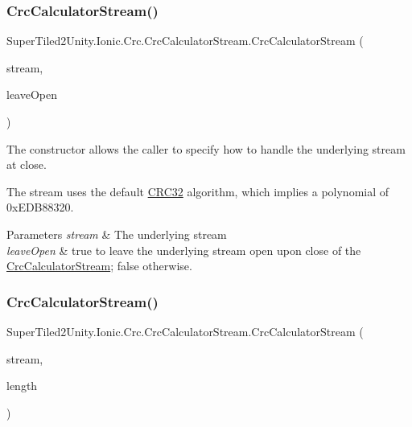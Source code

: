 \subsubsection{\texorpdfstring{Crc\+Calculator\+Stream()}{CrcCalculatorStream()}\hspace{0.1cm}{\footnotesize\ttfamily [2/5]}}
{\footnotesize\ttfamily Super\+Tiled2\+Unity.\+Ionic.\+Crc.\+Crc\+Calculator\+Stream.\+Crc\+Calculator\+Stream (\begin{DoxyParamCaption}\item[{System.\+I\+O.\+Stream}]{stream,  }\item[{bool}]{leave\+Open }\end{DoxyParamCaption})}



The constructor allows the caller to specify how to handle the underlying stream at close. 

The stream uses the default \mbox{\hyperlink{class_super_tiled2_unity_1_1_ionic_1_1_crc_1_1_c_r_c32}{C\+R\+C32}} algorithm, which implies a polynomial of 0x\+E\+D\+B88320. 


\begin{DoxyParams}{Parameters}
{\em stream} & The underlying stream\\
\hline
{\em leave\+Open} & true to leave the underlying stream open upon close of the {\ttfamily \mbox{\hyperlink{class_super_tiled2_unity_1_1_ionic_1_1_crc_1_1_crc_calculator_stream}{Crc\+Calculator\+Stream}}}; false otherwise.\\
\hline
\end{DoxyParams}
\mbox{\label{class_super_tiled2_unity_1_1_ionic_1_1_crc_1_1_crc_calculator_stream_a51e8a4bd2e462dd66b58881a9aae18fc}} 
\subsubsection{\texorpdfstring{Crc\+Calculator\+Stream()}{CrcCalculatorStream()}\hspace{0.1cm}{\footnotesize\ttfamily [3/5]}}
{\footnotesize\ttfamily Super\+Tiled2\+Unity.\+Ionic.\+Crc.\+Crc\+Calculator\+Stream.\+Crc\+Calculator\+Stream (\begin{DoxyParamCaption}\item[{System.\+I\+O.\+Stream}]{stream,  }\item[{Int64}]{length }\end{DoxyParamCaption})}



